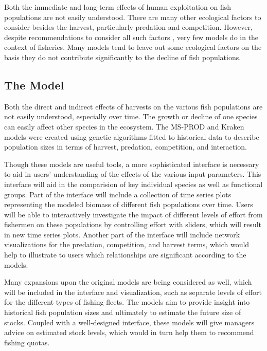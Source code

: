 \documentclass{article}
\begin{document}
Both the immediate and long-term effects of human exploitation on fish populations are not easily understood.  There are many other ecological factors to consider besides the harvest, particularly predation and competition.  However, despite recommendations to consider all such factors \cite{united1999ecosystem}, very few models do in the context of fisheries.  Many models tend to leave out some ecological factors on the basis they do not contribute significantly to the decline of fish populations. 




\subsection{The Model}

Both the direct and indirect effects of harvests on the various fish populations are not easily understood, especially over time.  The growth or decline of one species can easily affect other species in the ecosystem.  The MS-PROD and Kraken models were created using genetic algorithms fitted to historical data to describe population sizes in terms of harvest, predation, competition, and interaction.

Though these models are useful tools, a more sophisticated interface is necessary to aid in users' understanding of the effects of the various input parameters.  This interface will aid in the comparision of key individual species as well as functional groups.  Part of the interface will include a collection of time series plots representing the modeled biomass of different fish populations over time.  Users will be able to interactively investigate the impact of different levels of effort from fishermen on these populations by controlling effort with sliders, which will result in new time series plots.  Another part of the interface will include network visualizations for the predation, competition, and harvest terms, which would help to illustrate to users which relationships are significant according to the models.  

Many expansions upon the original models are being considered as well, which will be included in the interface and visualization, such as separate levels of effort for the different types of fishing fleets.  The models aim to provide insight into historical fish population sizes and ultimately to estimate the future size of stocks.  Coupled with a well-designed interface, these models will give managers advice on estimated stock levels, which would in turn help them to recommend fishing quotas.
\end{document}
